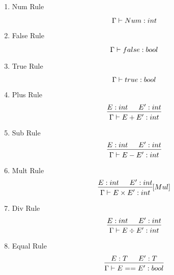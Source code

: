 \documentclass{scrreprt}
\begin{document}
\begin{multicols}{2}
\begin{enumerate}

    \item Num Rule
    \[
        \begin{prooftree}
            \infer [no rule] 0 {\Gamma \vdash Num: int}
        \end{prooftree} 
    \] 
    \item False Rule
    \[
        \begin{prooftree}
            \infer [no rule] 0 {\Gamma \vdash false: bool}
        \end{prooftree}
    \]
    \item True Rule
    \[
        \begin{prooftree}
            \infer [no rule] 0 {\Gamma \vdash true: bool}
        \end{prooftree}
    \]
    \item Plus Rule
        \[
            \begin{prooftree}
                \hypo {E : int}
                \hypo {E' : int}
                \infer 2 {\Gamma \vdash E + E' : int}
            \end{prooftree}
        \]
    \item Sub Rule
        \[
            \begin{prooftree}
                \hypo {E : int}
                \hypo {E' : int}
                \infer 2 {\Gamma \vdash E - E' : int}
            \end{prooftree}
        \]
    \item Mult Rule
        \[
            \begin{prooftree}
                \hypo {E : int}
                \hypo {E' : int}
                \infer 2 {\Gamma \vdash E \times E' : int}
            \end{prooftree} [Mul]
        \]
    \item Div Rule
        \[
            \begin{prooftree}
                \hypo {E : int}
                \hypo {E' : int}
                \infer 2 {\Gamma \vdash E \div E' : int}
            \end{prooftree} 
        \]
    \item Equal Rule
        \[
            \begin{prooftree}
                \hypo {E : T}
                \hypo {E' : T}
                \infer 2 {\Gamma \vdash E == E' : bool}

\end{prooftree}\]
\end{enumerate}
\end{multicols}
\end{document}
